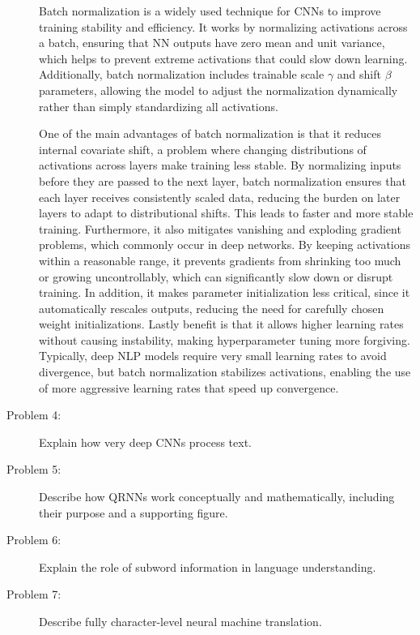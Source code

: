 \documentclass[10pt]{article}
\begin{document}
\begin{description}
Batch normalization is a widely used technique for CNNs to improve training stability and efficiency.
It works by normalizing activations across a batch, ensuring that NN outputs have zero mean and unit variance, 
which helps to prevent extreme activations that could slow down learning. 
Additionally, batch normalization includes trainable scale $\gamma$ and shift $\beta$  parameters, 
allowing the model to adjust the normalization dynamically rather than simply standardizing all activations.

One of the main advantages of batch normalization is that it reduces internal covariate shift, 
a problem where changing distributions of activations across layers make training less stable. 
By normalizing inputs before they are passed to the next layer, batch normalization ensures that each layer receives consistently scaled data, 
reducing the burden on later layers to adapt to distributional shifts. This leads to faster and more stable training.
Furthermore, it also mitigates vanishing and exploding gradient problems, which commonly occur in deep networks. 
By keeping activations within a reasonable range, it prevents gradients from shrinking too much or growing uncontrollably, 
which can significantly slow down or disrupt training. In addition, it makes parameter initialization less critical, 
since it automatically rescales outputs, reducing the need for carefully chosen weight initializations.
Lastly benefit is that it allows higher learning rates without causing instability, making hyperparameter tuning more forgiving. 
Typically, deep NLP models require very small learning rates to avoid divergence, but batch normalization stabilizes activations, 
enabling the use of more aggressive learning rates that speed up convergence.


\pagebreak

\item[Problem 4:]  Explain how very deep CNNs process text.

\pagebreak

\item[Problem 5:]  Describe how QRNNs work conceptually and mathematically, including their purpose and a supporting figure.

\pagebreak

\item[Problem 6:]  Explain the role of subword information in language understanding.

\pagebreak

\item[Problem 7:]  Describe fully character-level neural machine translation.


\end{description}
\end{document}
